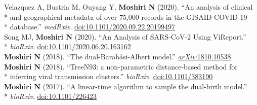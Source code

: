 \documentclass[margin,line]{res}
\begin{document}
\begin{resume}
\hspace*{4mm} Velazquez A, Bustria M, Ouyang Y, \textbf{Moshiri N} (2020). ``An analysis of clinical\\*
\hspace*{9.5mm} and geographical metadata of over 75,000 records in the GISAID COVID-19\\*\vspace{2mm}
\hspace*{8mm} database.'' \textit{medRxiv}. \href{https://doi.org/10.1101/2020.09.22.20199497}{doi:10.1101/2020.09.22.20199497}\\
\hspace*{4mm} Song MJ, \textbf{Moshiri N} (2020). ``An Analysis of SARS-CoV-2 Using ViReport.''\\*\vspace{2mm}
\hspace*{8mm} \textit{bioRxiv}. \href{https://doi.org/10.1101/2020.06.20.163162}{doi:10.1101/2020.06.20.163162}\\
\hspace*{4mm} \vspace{2mm}\textbf{Moshiri N} (2018). ``The dual-Barab\'asi-Albert model.'' \href{https://arxiv.org/abs/1810.10538}{\textit{arXiv}:1810.10538}\\
\hspace*{4mm} \textbf{Moshiri N} (2018). ``TreeN93: a non-parametric distance-based method for\\*\vspace{2mm}
\hspace*{8mm} inferring viral transmission clusters.'' \textit{bioRxiv}. \href{https://doi.org/10.1101/383190}{doi:10.1101/383190}\\
\hspace*{4mm} \textbf{Moshiri N} (2017). ``A linear-time algorithm to sample the dual-birth model.''\\*\vspace{2mm}
\hspace*{8mm} \textit{bioRxiv}. \href{https://doi.org/10.1101/226423}{doi:10.1101/226423}\\


\end{resume}
\end{document}
